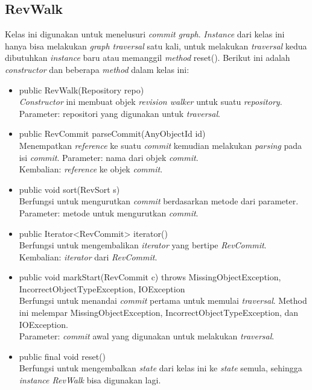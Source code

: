 \subsection{RevWalk}
\label{subsec:revwalk}
Kelas ini digunakan untuk menelusuri \textit{commit graph}. \textit{Instance} dari kelas ini hanya bisa melakukan  \textit{graph traversal} satu kali, untuk melakukan \textit{traversal} kedua dibutuhkan \textit{instance} baru atau memanggil \textit{method} reset(). Berikut ini adalah \textit{constructor} dan beberapa \textit{method} dalam kelas ini:
\begin{itemize}
\item public RevWalk(Repository repo)\\
\textit{Constructor} ini membuat objek \textit{revision walker} untuk suatu \textit{repository}.\\
Parameter: repositori yang digunakan untuk \textit{traversal}.  

\item public RevCommit parseCommit(AnyObjectId id)\\
Menempatkan \textit{reference} ke suatu \textit{commit} kemudian melakukan \textit{parsing} pada isi \textit{commit}.
Parameter: nama dari objek \textit{commit}.\\
Kembalian: \textit{reference} ke objek \textit{commit}.

\item public void sort(RevSort s)\\
Berfungsi untuk mengurutkan \textit{commit} berdasarkan metode dari parameter.\\
Parameter: metode untuk mengurutkan \textit{commit}.

\item public Iterator<RevCommit> iterator()\\
Berfungsi untuk mengembalikan \textit{iterator} yang bertipe \textit{RevCommit}.\\
Kembalian: \textit{iterator} dari \textit{RevCommit}.

\item public void markStart(RevCommit c) throws MissingObjectException, IncorrectObjectTypeException, IOException\\
Berfungsi untuk menandai \textit{commit} pertama untuk memulai \textit{traversal}. Method ini melempar MissingObjectException, IncorrectObjectTypeException, dan IOException.\\
Parameter: \textit{commit} awal yang digunakan untuk melakukan \textit{traversal}.

\item public final void reset()\\
Berfungsi untuk mengembalkan \textit{state} dari kelas ini ke \textit{state} semula, sehingga \textit{instance RevWalk} bisa digunakan lagi.
\end{itemize}

